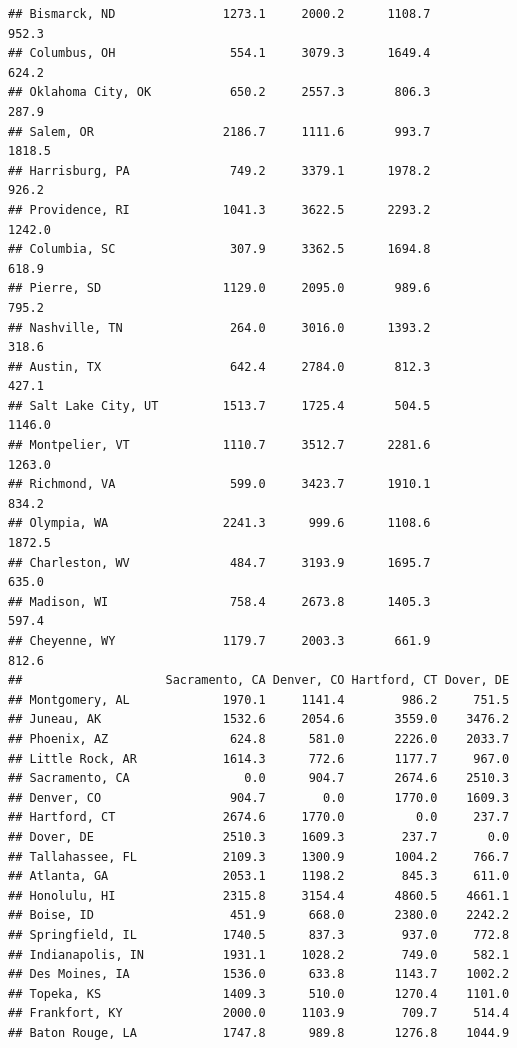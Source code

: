 \documentclass[
]{article}
\begin{document}
\begin{verbatim}
## Bismarck, ND               1273.1     2000.2      1108.7           952.3
## Columbus, OH                554.1     3079.3      1649.4           624.2
## Oklahoma City, OK           650.2     2557.3       806.3           287.9
## Salem, OR                  2186.7     1111.6       993.7          1818.5
## Harrisburg, PA              749.2     3379.1      1978.2           926.2
## Providence, RI             1041.3     3622.5      2293.2          1242.0
## Columbia, SC                307.9     3362.5      1694.8           618.9
## Pierre, SD                 1129.0     2095.0       989.6           795.2
## Nashville, TN               264.0     3016.0      1393.2           318.6
## Austin, TX                  642.4     2784.0       812.3           427.1
## Salt Lake City, UT         1513.7     1725.4       504.5          1146.0
## Montpelier, VT             1110.7     3512.7      2281.6          1263.0
## Richmond, VA                599.0     3423.7      1910.1           834.2
## Olympia, WA                2241.3      999.6      1108.6          1872.5
## Charleston, WV              484.7     3193.9      1695.7           635.0
## Madison, WI                 758.4     2673.8      1405.3           597.4
## Cheyenne, WY               1179.7     2003.3       661.9           812.6
##                    Sacramento, CA Denver, CO Hartford, CT Dover, DE
## Montgomery, AL             1970.1     1141.4        986.2     751.5
## Juneau, AK                 1532.6     2054.6       3559.0    3476.2
## Phoenix, AZ                 624.8      581.0       2226.0    2033.7
## Little Rock, AR            1614.3      772.6       1177.7     967.0
## Sacramento, CA                0.0      904.7       2674.6    2510.3
## Denver, CO                  904.7        0.0       1770.0    1609.3
## Hartford, CT               2674.6     1770.0          0.0     237.7
## Dover, DE                  2510.3     1609.3        237.7       0.0
## Tallahassee, FL            2109.3     1300.9       1004.2     766.7
## Atlanta, GA                2053.1     1198.2        845.3     611.0
## Honolulu, HI               2315.8     3154.4       4860.5    4661.1
## Boise, ID                   451.9      668.0       2380.0    2242.2
## Springfield, IL            1740.5      837.3        937.0     772.8
## Indianapolis, IN           1931.1     1028.2        749.0     582.1
## Des Moines, IA             1536.0      633.8       1143.7    1002.2
## Topeka, KS                 1409.3      510.0       1270.4    1101.0
## Frankfort, KY              2000.0     1103.9        709.7     514.4
## Baton Rouge, LA            1747.8      989.8       1276.8    1044.9

\end{verbatim}
\end{document}
